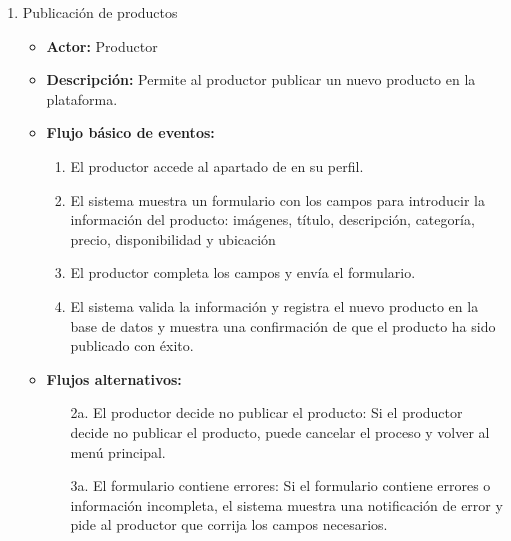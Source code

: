 \begin{enumerate}[CU-1:]
\item{Publicación de productos}
\begin{itemize}
	\item \textbf{Actor:} Productor
	\item \textbf{Descripción:} Permite al productor publicar un nuevo producto en la plataforma.
	\item \textbf{Flujo básico de eventos:}
	\begin{enumerate}[1:]
		\item El productor accede al apartado de  en su perfil.
		\item El sistema muestra un formulario con los campos para introducir la información del producto: imágenes, título, descripción, categoría, precio, disponibilidad y ubicación
		\item El productor completa los campos y envía el formulario.
		\item El sistema valida la información y registra el nuevo producto en la base de datos y muestra una confirmación de que el producto ha sido publicado con éxito.
		\end{enumerate}
	\item \textbf{Flujos alternativos:}
		\begin{itemize}
		\item[2a.] El productor decide no publicar el producto: Si el productor decide no publicar el producto, puede cancelar el proceso y volver al menú principal.
		\item[3a.] El formulario contiene errores: Si el formulario contiene errores o información incompleta, el sistema muestra una notificación de error y pide al productor que corrija los campos necesarios.
		\end{itemize}
\end{itemize}


\end{enumerate}
